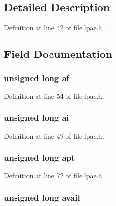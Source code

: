 \subsection{\-Detailed \-Description}


\-Definition at line 42 of file lpae.\-h.



\subsection{\-Field \-Documentation}
\hypertarget{structlpae__pt__t_a0f5634df96396057ace3b5f21b1cb381}{
\subsubsection[{af}]{\setlength{\rightskip}{0pt plus 5cm}unsigned long {\bf af}}}\label{structlpae__pt__t_a0f5634df96396057ace3b5f21b1cb381}


\-Definition at line 54 of file lpae.\-h.

\hypertarget{structlpae__pt__t_ab49c18e57563921295ef8942744109e9}{
\subsubsection[{ai}]{\setlength{\rightskip}{0pt plus 5cm}unsigned long {\bf ai}}}\label{structlpae__pt__t_ab49c18e57563921295ef8942744109e9}


\-Definition at line 49 of file lpae.\-h.

\hypertarget{structlpae__pt__t_a27acf8b422b08ad2eee782c2cd01f1df}{
\subsubsection[{apt}]{\setlength{\rightskip}{0pt plus 5cm}unsigned long {\bf apt}}}\label{structlpae__pt__t_a27acf8b422b08ad2eee782c2cd01f1df}


\-Definition at line 72 of file lpae.\-h.

\hypertarget{structlpae__pt__t_a09631255ee08cc058acd8bc1caff188c}{
\subsubsection[{avail}]{\setlength{\rightskip}{0pt plus 5cm}unsigned long {\bf avail}}}\label{structlpae__pt__t_a09631255ee08cc058acd8bc1caff188c}


